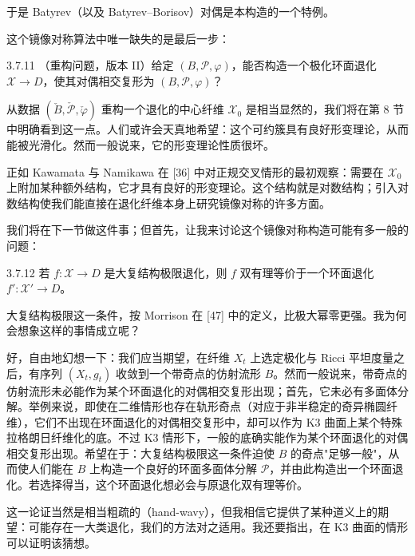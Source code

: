于是 Batyrev（以及 Batyrev--Borisov）对偶是本构造的一个特例。

这个镜像对称算法中唯一缺失的是最后一步：

\begin{question}{3.7.11}
（重构问题，版本 II）给定 $(B,\mathcal P,\varphi)$，能否构造一个极化环面退化 $\mathcal X\to D$，使其对偶相交复形为 $(B,\mathcal P,\varphi)$？
\end{question}

从数据 $(\check B,\check{\mathcal P},\check\varphi)$ 重构一个退化的中心纤维 $\mathcal X_0$ 是相当显然的，我们将在第 8 节中明确看到这一点。人们或许会天真地希望：这个可约簇具有良好形变理论，从而能被光滑化。然而一般说来，它的形变理论性质很坏。

正如 Kawamata 与 Namikawa 在 [36] 中对正规交叉情形的最初观察：需要在 $\mathcal X_0$ 上附加某种额外结构，它才具有良好的形变理论。这个结构就是对数结构；引入对数结构使我们能直接在退化纤维本身上研究镜像对称的许多方面。

我们将在下一节做这件事；但首先，让我来讨论这个镜像对称构造可能有多一般的问题：

\begin{conjecture}{3.7.12}
若 $f:\mathcal X\to D$ 是大复结构极限退化，则 $f$ 双有理等价于一个环面退化 $f':\mathcal X'\to D$。
\end{conjecture}

大复结构极限这一条件，按 Morrison 在 [47] 中的定义，比极大幂零更强。我为何会想象这样的事情成立呢？

好，自由地幻想一下：我们应当期望，在纤维 $X_t$ 上选定极化与 Ricci 平坦度量之后，有序列 $(X_t,g_t)$ 收敛到一个带奇点的仿射流形 $B$。然而一般说来，带奇点的仿射流形未必能作为某个环面退化的对偶相交复形出现；首先，它未必有多面体分解。举例来说，即使在二维情形也存在轨形奇点（对应于非半稳定的奇异椭圆纤维），它们不出现在环面退化的对偶相交复形中，却可以作为 K3 曲面上某个特殊拉格朗日纤维化的底。不过 K3 情形下，一般的底确实能作为某个环面退化的对偶相交复形出现。希望在于：大复结构极限这一条件迫使 $B$ 的奇点"足够一般"，从而使人们能在 $B$ 上构造一个良好的环面多面体分解 $\mathcal P$，并由此构造出一个环面退化。若选择得当，这个环面退化想必会与原退化双有理等价。

这一论证当然是相当粗疏的（hand-wavy），但我相信它提供了某种道义上的期望：可能存在一大类退化，我们的方法对之适用。我还要指出，在 K3 曲面的情形可以证明该猜想。

